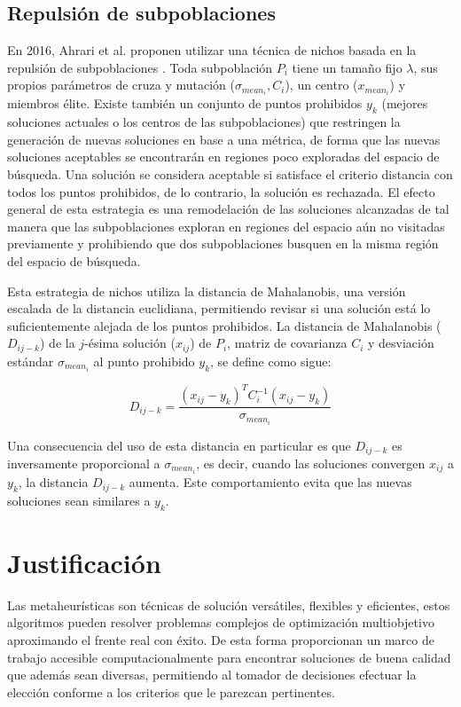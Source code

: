 \documentclass[letterpaper,10pt]{article}
\begin{document}
\subsection{Repulsión de subpoblaciones}

En 2016, Ahrari et al. proponen utilizar una técnica de nichos basada en la repulsión de subpoblaciones \cite{ahrari2016multimodal}. Toda subpoblación $P_i$ tiene un tamaño fijo $\lambda$,
sus propios parámetros de cruza y mutación ($\sigma_{mean_i},C_i$), un centro ($x_{mean_i}$) y miembros élite. Existe también un conjunto de puntos prohibidos $y_k$
(mejores soluciones actuales o los centros de las subpoblaciones) que restringen la generación de nuevas soluciones en base a una métrica, de forma que las nuevas soluciones aceptables
se encontrarán en regiones poco exploradas del espacio de búsqueda. Una solución se considera aceptable si satisface el criterio distancia con todos los puntos prohibidos, de lo contrario,
la solución es rechazada. El efecto general de esta estrategia es una remodelación de las soluciones alcanzadas de tal manera que las subpoblaciones exploran en regiones del espacio
aún no visitadas previamente y prohibiendo que dos subpoblaciones busquen en la misma región del espacio de búsqueda.
\newline

Esta estrategia de nichos utiliza la distancia de Mahalanobis\cite{mahalanobis1936generalised}, una versión escalada de la distancia euclidiana, permitiendo revisar si una solución está lo suficientemente
alejada de los puntos prohibidos. La distancia de Mahalanobis ($D_{ij-k}$) de la $j$-ésima solución ($x_{ij}$) de $P_i$, matriz de covarianza $C_i$ y desviación estándar $\sigma_{mean_i}$ al punto prohibido
$y_k$, se define como sigue:

$$D_{ij-k} = \frac{(x_{ij}-y_k)^T C^{-1}_i (x_{ij}-y_k)}{\sigma_{mean_i}}$$

Una consecuencia del uso de esta distancia en particular es que $D_{ij-k}$ es inversamente proporcional a $\sigma_{mean_i}$, es decir, cuando las soluciones convergen $x_{ij}$ a $y_k$,
la distancia $D_{ij-k}$ aumenta. Este comportamiento evita que las nuevas soluciones sean similares a $y_k$.



\section{Justificación}

Las metaheurísticas son técnicas de solución versátiles, flexibles y eficientes, estos algoritmos pueden resolver problemas complejos de optimización multiobjetivo \cite{coello1999comprehensive} aproximando el frente real con éxito. 
De esta forma proporcionan un marco de trabajo accesible computacionalmente para encontrar soluciones de buena calidad que además sean diversas, permitiendo al tomador de decisiones efectuar la elección conforme a los criterios que le parezcan pertinentes.
\newline
\end{document}
